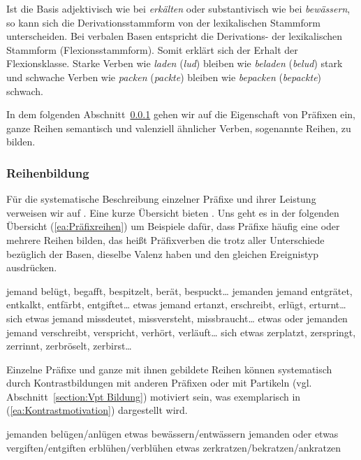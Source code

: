 Ist die Basis adjektivisch wie bei \textit{erkälten} oder substantivisch wie bei \textit{bewässern}, so kann sich die Derivationsstammform von der lexikalischen Stammform unterscheiden. Bei verbalen Basen entspricht die Derivations- der lexikalischen Stammform (Flexionsstammform). Somit erklärt sich der Erhalt der Flexionsklasse. Starke Verben wie \textit{laden} (\textit{lud}) bleiben wie \textit{beladen} (\textit{belud}) stark und schwache Verben wie \textit{packen} (\textit{packte}) bleiben wie \textit{bepacken} (\textit{bepackte}) schwach.  

In dem folgenden Abschnitt~\ref{subsubsection:Reihe_Motivation_Präf} gehen wir auf die Eigenschaft von Präfixen ein, ganze Reihen semantisch und valenziell ähnlicher Verben, sogenannte Reihen, zu bilden. 


\subsubsection{Reihenbildung}\label{subsubsection:Reihe_Motivation_Präf}

Für die systematische Beschreibung einzelner Präfixe und ihrer Leistung verweisen wir auf \citet[141--375]{Kuehnhold1973}. Eine kurze Übersicht bieten \citet[383--395]{FleischerBarz2012}. Uns geht es in der folgenden Übersicht (\ref{ea:Präfixreihen}) um Beispiele dafür, dass Präfixe häufig eine oder mehrere Reihen bilden, das heißt Präfixverben die trotz aller Unterschiede bezüglich der Basen, dieselbe Valenz haben und den gleichen Ereignistyp ausdrücken.

\ea \label{ea:Präfixreihen}
\ea \label{ea:be_V} jemand belügt, begafft, bespitzelt, berät, bespuckt\ldots{} jemanden
\ex \label{ex:ent_V} jemand entgrätet, entkalkt, entfärbt, entgiftet\ldots{} etwas
\ex \label{ex:er_V} jemand ertanzt, erschreibt, erlügt, erturnt\ldots{} sich etwas
\ex \label{ex:miss_V} jemand missdeutet, missversteht, missbraucht\ldots{} etwas oder jemanden
\ex \label{ex:ver_V} jemand verschreibt, verspricht, verhört, verläuft\ldots{} sich
\ex \label{ex:zer_V} etwas zerplatzt, zerspringt, zerrinnt, zerbröselt, zerbirst\ldots{} 
\z 
\z 

Einzelne Präfixe und ganze mit ihnen gebildete Reihen können systematisch durch Kontrastbildungen mit anderen Präfixen oder mit Partikeln (vgl. Abschnitt~\ref{section:Vpt Bildung}) motiviert sein, was exemplarisch in (\ref{ea:Kontrastmotivation}) dargestellt wird.

\ea \label{ea:Kontrastmotivation}
\ea \label{ea:be_an} jemanden belügen/anlügen
\ex \label{ex:be_ent} etwas bewässern/entwässern
\ex \label{ex:ver_ent} jemanden oder etwas vergiften/entgiften
\ex \label{ex:er_ver} erblühen/verblühen
\ex \label{ex:zer_be_an} etwas zerkratzen/bekratzen/ankratzen
\z 
\z 

